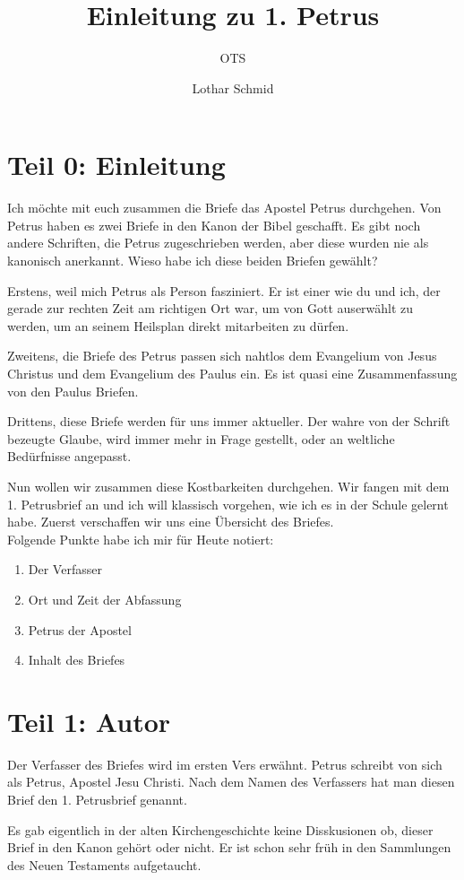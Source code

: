 \documentclass[fontsize=16pt]{mybib}
\author{OTS}
\title{Einleitung zu 1. Petrus}
\author{Lothar Schmid}
\date{}
\begin{document}
\mytitlepage
\tableofcontents
\newpage

\section{Teil 0: Einleitung}
Ich möchte mit euch zusammen die Briefe das Apostel Petrus durchgehen. Von Petrus haben es zwei Briefe in den Kanon der Bibel geschafft. Es gibt noch andere Schriften, die  Petrus zugeschrieben werden, aber diese wurden nie als kanonisch anerkannt. Wieso habe ich diese beiden Briefen gewählt?

Erstens, weil mich Petrus als Person fasziniert. Er ist einer wie du und ich, der gerade zur rechten Zeit am richtigen Ort war, um von Gott auserwählt zu werden, um an seinem Heilsplan direkt mitarbeiten zu dürfen.

Zweitens, die Briefe des Petrus passen sich nahtlos dem Evangelium von Jesus Christus und dem Evangelium des Paulus ein. Es ist quasi eine Zusammenfassung von den Paulus Briefen.

Drittens, diese Briefe werden für uns immer aktueller. Der wahre von der Schrift bezeugte Glaube, wird immer mehr in Frage gestellt, oder an weltliche Bedürfnisse angepasst.

Nun wollen wir zusammen diese Kostbarkeiten durchgehen. Wir fangen mit dem 1. Petrusbrief an und ich will klassisch vorgehen, wie ich es in der Schule gelernt habe. Zuerst verschaffen wir uns eine Übersicht des Briefes.\\
Folgende Punkte habe ich mir für Heute notiert:
\begin{enumerate}
    \item Der Verfasser
    \item Ort und Zeit der Abfassung
    \item Petrus der Apostel
    \item Inhalt des Briefes
\end{enumerate}

\section{Teil 1: Autor}
 Der Verfasser des Briefes wird im ersten Vers erwähnt. Petrus schreibt von sich als Petrus, Apostel Jesu Christi. Nach dem Namen des Verfassers hat man diesen Brief den 1. Petrusbrief genannt.

Es gab eigentlich in der alten Kirchengeschichte keine Disskusionen ob, dieser Brief in den Kanon gehört oder nicht. Er ist schon sehr früh in den Sammlungen des Neuen Testaments aufgetaucht. 
\end{document}

